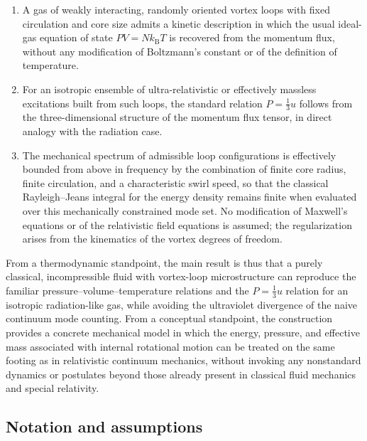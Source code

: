 \documentclass[11pt]{article}
\begin{document}
        \begin{enumerate}
            \item A gas of weakly interacting, randomly oriented vortex loops with fixed circulation
            and core size admits a kinetic description in which the usual ideal-gas equation of
            state $PV = N k_{\mathrm B} T$ is recovered from the momentum flux, without any
            modification of Boltzmann's constant or of the definition of temperature.

            \item For an isotropic ensemble of ultra-relativistic or effectively massless excitations
            built from such loops, the standard relation $P = \tfrac{1}{3}u$ follows from the
            three-dimensional structure of the momentum flux tensor, in direct analogy with
            the radiation case.

            \item The mechanical spectrum of admissible loop configurations is effectively bounded from
            above in frequency by the combination of finite core radius, finite circulation, and
            a characteristic swirl speed, so that the classical Rayleigh--Jeans integral for the
            energy density remains finite when evaluated over this mechanically constrained mode
            set. No modification of Maxwell's equations or of the relativistic field equations is
            assumed; the regularization arises from the kinematics of the vortex degrees of freedom.
        \end{enumerate}

        From a thermodynamic standpoint, the main result is thus that a purely classical,
        incompressible fluid with vortex-loop microstructure can reproduce the familiar
        pressure--volume--temperature relations and the $P = \tfrac{1}{3}u$ relation for an isotropic
        radiation-like gas, while avoiding the ultraviolet divergence of the naive continuum mode
        counting. From a conceptual standpoint, the construction provides a concrete mechanical model
        in which the energy, pressure, and effective mass associated with internal rotational motion
        can be treated on the same footing as in relativistic continuum mechanics, without invoking
        any nonstandard dynamics or postulates beyond those already present in classical fluid
        mechanics and special relativity.

        \subsection*{Notation and assumptions}
            \label{subsec:notation-assumptions}
\end{document}
